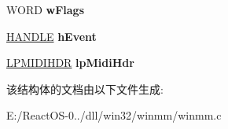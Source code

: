 \begin{DoxyCompactItemize}
\item 
\mbox{\label{struct_w_i_n_e___m_i_d_i_stream_a030d1dfeabcafe4011a09ae68a2572bf}} 
W\+O\+RD {\bfseries w\+Flags}
\item 
\mbox{\label{struct_w_i_n_e___m_i_d_i_stream_a2dad489d378c7950a3d61ab5232f467b}} 
\hyperlink{interfacevoid}{H\+A\+N\+D\+LE} {\bfseries h\+Event}
\item 
\mbox{\label{struct_w_i_n_e___m_i_d_i_stream_a50fd51ae974bf447eecf3c16c5f6b0f5}} 
\hyperlink{structmidihdr__tag}{L\+P\+M\+I\+D\+I\+H\+DR} {\bfseries lp\+Midi\+Hdr}
\end{DoxyCompactItemize}


该结构体的文档由以下文件生成\+:\begin{DoxyCompactItemize}
\item 
E\+:/\+React\+O\+S-\/0../dll/win32/winmm/winmm.\+c\end{DoxyCompactItemize}
